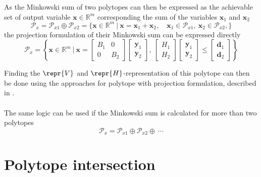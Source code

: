 As the Minkowski sum of two polytopes can then be expressed as the achievable set of output variable $\bm{x}\in\mathbb{R}^m$ corresponding the sum of the variables $\bm{x}_1$ and $\bm{x}_2$
\begin{equation}
    \mathcal{P}_{x}= \mathcal{P}_{x1} \oplus \mathcal{P}_{x2} = \{\bm{x}\in\mathbb{R}^m ~|~ \bm{x} =  \bm{x}_1 + \bm{x}_2, \quad \bm{x}_1 \in \mathcal{P}_{x1}, ~\bm{x}_2 \in \mathcal{P}_{x2},  \}
\end{equation}
the projection formulation of their Minkowski sum can be expressed directly
\begin{equation}
    \mathcal{P}_{x}=\left\{\bm{x}\in\mathbb{R}^m ~\bigg|~ 
    \bm{x} = \begin{bmatrix}
        B_1 & 0 \\
        0 & B_2
    \end{bmatrix}\begin{bmatrix}
        \bm{y}_1 \\
        \bm{y}_2
    \end{bmatrix}, ~\begin{bmatrix}
        H_1  \\
        H_2
    \end{bmatrix} \begin{bmatrix}
        \bm{y}_1 \\
        \bm{y}_2
    \end{bmatrix} \leq \begin{bmatrix}
        \bm{d}_1  \\
        \bm{d}_2
    \end{bmatrix} \right\}
\end{equation}

Finding the $\repr{V}$ and $\repr{H}$-representation of this polytope can then be done using the approaches  for polytope with projection formulation, described in .

\paragraph*{} The same logic can be used if the Minkowski sum is calculated for more than two polytopes 
\begin{equation}
    \mathcal{P}_x = \mathcal{P}_{x1} \oplus \mathcal{P}_{x2} \oplus ~\cdots
\end{equation}

\section{Polytope intersection}

